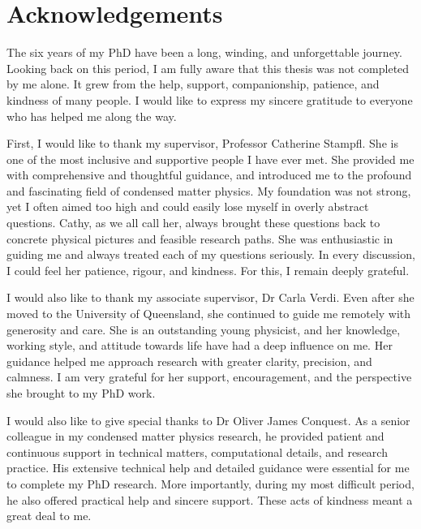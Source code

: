 \chapter*{Acknowledgements}


The six years of my PhD have been a long, winding, and unforgettable journey.
Looking back on this period, I am fully aware that this thesis was not completed by me alone.
It grew from the help, support, companionship, patience, and kindness of many people.
I would like to express my sincere gratitude to everyone who has helped me along the way.


First, I would like to thank my supervisor, Professor Catherine Stampfl.
She is one of the most inclusive and supportive people I have ever met.
She provided me with comprehensive and thoughtful guidance,
and introduced me to the profound and fascinating field of condensed matter physics.
My foundation was not strong, yet I often aimed too high and could easily lose myself in overly abstract questions.
Cathy, as we all call her, always brought these questions back to concrete physical pictures and feasible research paths.
She was enthusiastic in guiding me and always treated each of my questions seriously.
In every discussion, I could feel her patience, rigour, and kindness.
For this, I remain deeply grateful.

I would also like to thank my associate supervisor, Dr Carla Verdi.
Even after she moved to the University of Queensland,
she continued to guide me remotely with generosity and care.
She is an outstanding young physicist,
and her knowledge, working style, and attitude towards life have had a deep influence on me.
Her guidance helped me approach research with greater clarity, precision, and calmness.
I am very grateful for her support, encouragement, and the perspective she brought to my PhD work.

I would also like to give special thanks to Dr Oliver James Conquest.
As a senior colleague in my condensed matter physics research,
he provided patient and continuous support in technical matters, computational details, and research practice.
His extensive technical help and detailed guidance were essential for me to complete my PhD research.
More importantly, during my most difficult period,
he also offered practical help and sincere support.
These acts of kindness meant a great deal to me.

